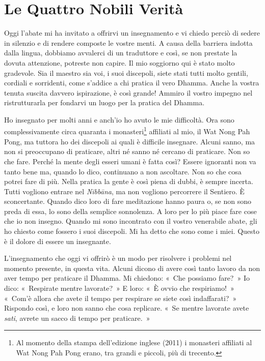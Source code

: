 \chapter{Le Quattro Nobili Verità}

Oggi l'abate mi ha invitato a offrirvi un insegnamento e vi chiedo
perciò di sedere in silenzio e di rendere composte le vostre menti. A
causa della barriera indotta dalla lingua, dobbiamo avvalerci di un
traduttore e così, se non prestate la dovuta attenzione, potreste non
capire. Il mio soggiorno qui è stato molto gradevole. Sia il maestro sia
voi, i suoi discepoli, siete stati tutti molto gentili, cordiali e
sorridenti, come s'addice a chi pratica il vero Dhamma. Anche la vostra
tenuta suscita davvero ispirazione, è così grande! Ammiro il vostro
impegno nel ristrutturarla per fondarvi un luogo per la pratica del
Dhamma.

Ho insegnato per molti anni e anch'io ho avuto le mie difficoltà. Ora
sono complessivamente circa quaranta i monasteri\footnote{Al momento
  della stampa dell'edizione inglese (2011) i monasteri affiliati al Wat
  Nong Pah Pong erano, tra grandi e piccoli, più di trecento.} affiliati
al mio, il Wat Nong Pah Pong, ma tuttora ho dei discepoli ai quali è
difficile insegnare. Alcuni sanno, ma non si preoccupano di praticare,
altri né sanno né cercano di praticare. Non so che fare. Perché la mente
degli esseri umani è fatta così? Essere ignoranti non va tanto bene ma,
quando lo dico, continuano a non ascoltare. Non so che cosa potrei fare
di più. Nella pratica la gente è così piena di dubbi, è sempre incerta.
Tutti vogliono entrare nel \emph{Nibbāna}, ma non vogliono percorrere il
Sentiero. È sconcertante. Quando dico loro di fare meditazione hanno
paura o, se non sono preda di essa, lo sono della semplice sonnolenza. A
loro per lo più piace fare cose che io non insegno. Quando mi sono
incontrato con il vostro venerabile abate, gli ho chiesto come fossero i
suoi discepoli. Mi ha detto che sono come i miei. Questo è il dolore di
essere un insegnante.

L'insegnamento che oggi vi offrirò è un modo per risolvere i problemi
nel momento presente, in questa vita. Alcuni dicono di avere così tanto
lavoro da non aver tempo per praticare il Dhamma. Mi chiedono: «~Che
possiamo fare?~» Io dico: «~Respirate mentre lavorate?~» E loro: «~È
ovvio che respiriamo!~» «~Com'è allora che avete il tempo per respirare
se siete così indaffarati?~» Rispondo così, e loro non sanno che cosa
replicare. «~Se mentre lavorate avete \emph{sati}, avrete un sacco di
tempo per praticare.~»

